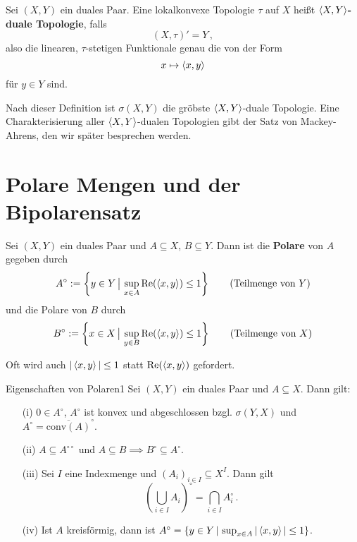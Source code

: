 \documentclass{article}
\begin{document}
	\begin{Def}{}{}
		Sei $(X,Y)$ ein duales Paar. Eine lokalkonvexe Topologie $\tau$ auf $X$ heißt \textbf{$\left\langle X,Y\right\rangle$-duale Topologie}, falls 
		\[(X,\tau)'=Y\,,\]
		also die linearen, $\tau$-stetigen Funktionale genau die von der Form
		\[x\mapsto\left\langle x,y\right\rangle\]
		für $y\in Y$ sind.
	\end{Def}
	
	Nach dieser Definition ist $\sigma(X,Y)$ die gröbste $\left\langle X,Y\right\rangle$-duale Topologie. Eine Charakterisierung aller $\left\langle X,Y\right\rangle$-dualen Topologien gibt der Satz von Mackey-Ahrens, den wir später besprechen werden.
	
	\section{Polare Mengen und der Bipolarensatz}
	
	\begin{Def}{}{}
		Sei $(X,Y)$ ein duales Paar und $A\subseteq X$, $B\subseteq Y$. Dann ist die \textbf{Polare} von $A$ gegeben durch
		\[A^{\circ}:=\left\{y\in Y\,\big|\,\sup_{x\in A}\operatorname{\textrm{Re}}(\left\langle x,y\right\rangle)\le 1\right\}\tag{Teilmenge von $Y$}\]
		und die Polare von $B$ durch
		\[B^{\circ}:=\left\{x\in X\,\big|\,\sup_{y\in B}\operatorname{\textrm{Re}}(\left\langle x,y\right\rangle)\le 1\right\}\tag{Teilmenge von $X$}\]
	\end{Def}
	
	{\selectfont{}\relax} Oft wird auch $|\left\langle x,y\right\rangle|\le 1$ statt $\operatorname{\textrm{Re}}(\left\langle x,y\right\rangle)$ gefordert.
	

	
	\begin{Lemma}{Eigenschaften von Polaren}{1}
		Sei $(X,Y)$ ein duales Paar und $A\subseteq X$. Dann gilt:
		\begin{itemize}
			\item[(i)] $0\in A^{\circ}$, $A^{\circ}$ ist konvex und abgeschlossen bzgl. $\sigma(Y,X)$ und $A^{\circ}=\overline{\mathrm{conv}(A)}^{\circ}$.
			\item[(ii)] $A\subseteq A^{\circ\circ}$ und $A\subseteq B\implies B^{\circ}\subseteq A^{\circ}$.
			\item[(iii)] Sei $I$ eine Indexmenge und $(A_i)_{i\in I}\subseteq X^I$. Dann gilt
			\[\left(\bigcup_{i\in I} A_i\right)^{\circ}=\bigcap_{i\in I}A_i^{\circ}\,.\]
			\item[(iv)] Ist $A$ kreisförmig, dann ist $A^{\circ}=\{y\in Y\,|\, \sup_{x\in A}|\left\langle x,y\right\rangle|\le 1\}$.
			\end{itemize}
	\end{Lemma}
	
\end{document}
